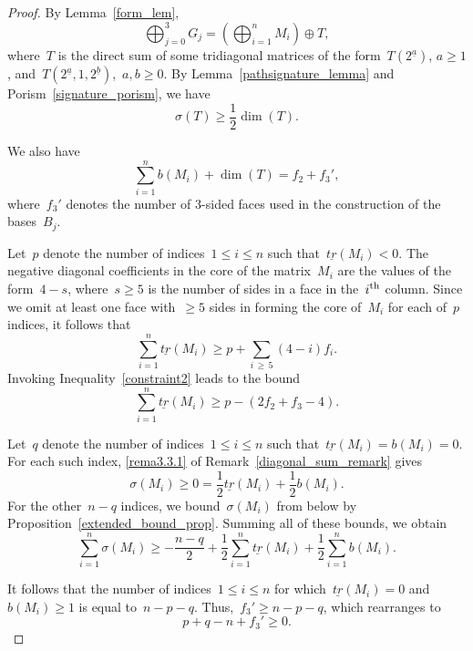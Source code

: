 \documentclass[AHL,Unicode,longabstracts,published]{cedram}
\begin{document}
\begin{proof}
By Lemma~\ref{form_lem},
\begin{equation}\label{e: g sum}
\bigoplus_{j=0}^3 G_j = \left(\bigoplus_{i=1}^n M_i \right) \oplus T,
\end{equation}
where~$T$ is the direct sum of some tridiagonal matrices of the form~$T(2^{\underline a})$, $a \ge 1$, and~$T(2^{\underline a}, 1, 2^{\underline b})$,~$a,b \ge 0$. By Lemma~\ref{pathsignature_lemma} and Porism~\ref{signature_porism}, we have
\begin{equation}\label{e: T bound}
\sigma(T) \ge \frac12 \dim(T).
\end{equation}

We also have
\begin{equation}\label{e: k bound}
\sum_{i=1}^n b(M_i) + \dim(T) = f_2 + f_3',
\end{equation}
where~$f_3'$ denotes the number of 3-sided faces used in the construction of the bases~$B_j$.


Let~$p$ denote the number of indices~$1 \le i \le n$ such that~$\underline{tr}(M_i) < 0$. The negative diagonal coefficients in the core of the matrix~$M_i$ are the values of the form~$4-s$, where~$s \ge 5$ is the number of sides in a face in the~$i^{\rm th}$ column. Since we omit at least one face with~$\ge 5$ sides in forming the core of~$M_i$ for each of~$p$ indices, it follows that
\[
\sum_{i=1}^n \underline{tr}(M_i) \ge p+ \sum_{i\,\ge\,5} (4-i)f_i.
\]
Invoking Inequality~\eqref{constraint2} leads to the bound
\begin{equation}\label{e: d bound}
\sum_{i=1}^n \underline{tr}(M_i) \ge p - (2f_2 + f_3 - 4).
\end{equation}


Let~$q$ denote the number of indices~$1 \le i \le n$ such that~$\underline{tr}(M_i) = b(M_i) = 0$. For each such index, \eqref{rema3.3.1} of Remark~\ref{diagonal_sum_remark} gives
\[
\sigma(M_i) \ge 0 = \frac12 \underline{tr}(M_i) + \frac12 b(M_i).
\]
For the other~$n-q$ indices, we bound~$\sigma(M_i)$ from below by Proposition~\ref{extended_bound_prop}. Summing all of these bounds, we obtain
\begin{equation}\label{e: sigma bound}
\sum_{i=1}^n \sigma(M_i) \ge -\frac{n-q}{2} + \frac12 \sum_{i=1}^n \underline{tr}(M_i) + \frac12 \sum_{i=1}^n b(M_i).
\end{equation}

It follows that the number of indices~$1 \le i \le n$ for which~$\underline{tr}(M_i) = 0$ and~$b(M_i) \ge 1$ is equal to~$n-p-q$. Thus,~$f_3' \ge n-p-q$, which rearranges to
\begin{equation}\label{e: f3' bound}
p+q -n + f_3' \ge 0.
\end{equation}


\end{proof}
\end{document}
